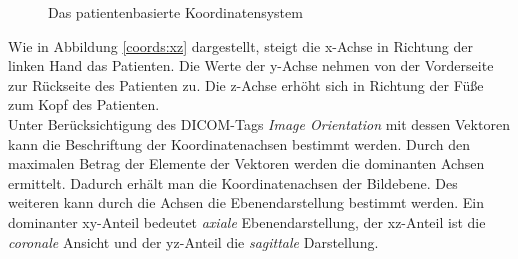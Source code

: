 \begin{figure}[htb]
\centering
{}
\caption{Das patientenbasierte Koordinatensystem}
\label{coords:both}
\end{figure}

Wie in Abbildung \ref{coords:xz} dargestellt, steigt die x-Achse in Richtung der linken Hand das Patienten. Die Werte der y-Achse nehmen von der Vorderseite zur Rückseite des Patienten zu. Die z-Achse erhöht sich in Richtung der Füße zum Kopf des Patienten\cite[C.7.6.2.1.1]{dicom:iod}.\\
Unter Berücksichtigung des DICOM-Tags \textit{Image Orientation} mit dessen Vektoren kann die Beschriftung der Koordinatenachsen bestimmt werden. Durch den maximalen Betrag der Elemente der Vektoren werden die dominanten Achsen ermittelt. Dadurch erhält man die Koordinatenachsen der Bildebene. Des weiteren kann durch die Achsen die Ebenendarstellung bestimmt werden. Ein dominanter xy-Anteil bedeutet \textit{axiale} Ebenendarstellung, der xz-Anteil ist die \textit{coronale} Ansicht und der yz-Anteil die \textit{sagittale} Darstellung.


